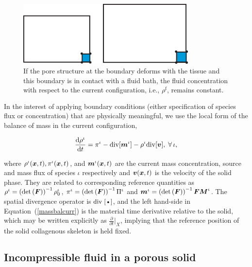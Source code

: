 \begin{figure}
\centering
\includegraphics[width=0.8\textwidth]{images/elucidation/concentration}
\caption{If the pore structure at the boundary deforms with the
tissue and this boundary is in contact with a fluid bath, the
fluid concentration with respect to the current configuration,
i.e., $\rho^\mathrm{f}$, remains constant.}\label{fbc}
\end{figure}

In the interest of applying boundary conditions (either specification
of species flux or concentration) that are physically meaningful, we
use the local form of the balance of mass in the current
configuration,

\begin{equation}
\frac{\mathrm{d}\rho^\iota}{\mathrm{d}t} = \pi^\iota-
\mathrm{\small{div}}[\mbox{\boldmath$ m$}^\iota] - \rho^\iota
\mathrm{\small{div}}[\mbox{\boldmath$ v$}],\;\forall\,\iota, \label{massbalcurr}
\end{equation}

\noindent where $\rho^\iota(\mbox{\boldmath$ x$},t),\pi^\iota(\mbox{\boldmath$ x$},t)$, and
$\mbox{\boldmath$ m$}^\iota(\mbox{\boldmath$ x$},t)$ are the current mass concentration, source and mass
flux of species $\iota$ respectively and $\mbox{\boldmath$ v$}(\mbox{\boldmath$ x$},t)$ is the velocity
of the solid phase. They are related to corresponding reference
quantities as $\rho^\iota = \left(\mathrm{det} \left(\mbox{\boldmath$ F$}\right)
\right)^{-1} \rho_0^\iota$, $\pi^\iota = \left(\mathrm{det}
\left(\mbox{\boldmath$ F$}\right) \right)^{-1} \Pi^\iota$ and $\mbox{\boldmath$ m$}^\iota =
\left(\mathrm{det} \left(\mbox{\boldmath$ F$}\right) \right)^{-1} \mbox{\boldmath$ F$} \mbox{\boldmath$ M$}^\iota$. The
spatial divergence operator is $\mbox{\small{div} [\textbullet]}$, and
the left hand-side in Equation~(\ref{massbalcurr}) is the material
time derivative relative to the solid, which may be written explicitly as
$\frac{\partial}{\partial t}\vert_X$, implying that the reference
position of the solid collagenous skeleton is held fixed.

\subsection{Incompressible fluid in a porous solid}
\label{incompressible-fluid-porous-solid}

